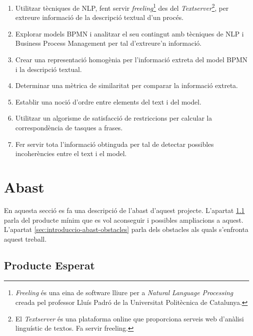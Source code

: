 \begin{enumerate}
    \item Utilitzar tècniques de NLP, fent servir \emph{freeling}\footnote{\emph{Freeling} \cite{freeling} és una eina de software lliure per a \emph{Natural Language Processing} creada pel professor Lluís Padró de la Universitat Politècnica de Catalunya.} des del \emph{Textserver}\footnote{El \emph{Textserver} \cite{textserver} és una plataforma online que proporciona serveis web d'anàlisi linguístic de textos. Fa servir freeling.}, per extreure informació de la descripció textual d'un procés.
    \item Explorar models BPMN i analitzar el seu contingut amb tècniques de NLP i Business Process Management per tal d'extreure'n informació.
    \item Crear una representació homogènia per l'informació extreta del model BPMN i la descripció textual.
    \item Determinar una mètrica de similaritat per comparar la informació extreta.
    \item Establir una noció d'ordre entre elements del text i del model.
    \item Utilitzar un algorisme de satisfacció de restriccions per calcular la correspondència de tasques a frases.
    \item Fer servir tota l'informació obtinguda per tal de detectar possibles incoherències entre el text i el model.
\end{enumerate}
    
\section{Abast}
\label{sec:introduccio-abast}

En aquesta secció es fa una descripció de l'abast d'aquest projecte. L'apartat \ref{sec:introduccio-abast-producte_esperat} parla del producte mínim que es vol aconseguir i possibles ampliacions a aquest. L'apartat \ref{sec:introduccio-abast-obstacles} parla dels obstacles als quals s'enfronta aquest treball.

\subsection{Producte Esperat}
\label{sec:introduccio-abast-producte_esperat}

